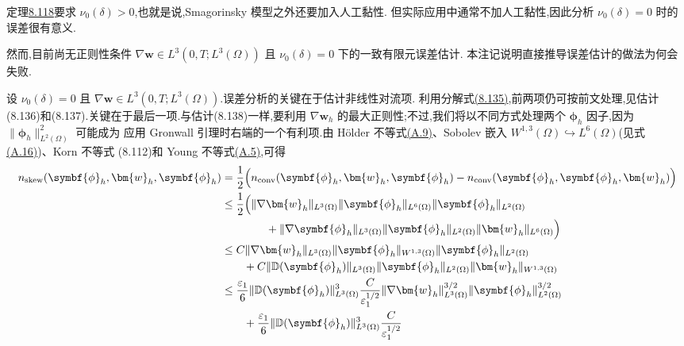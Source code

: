 \begin{note}[自然正则性下且 $\nu_0(\delta)=0$ 的情形]
\label{note:smagorinsky-error-regularity-case}
定理\hyperref[thm:smagorinsky-fem-error-estimate-standard]{8.118}要求
$\nu_0(\delta)>0$,也就是说,Smagorinsky 模型之外还要加入人工黏性.
但实际应用中通常不加人工黏性,因此分析 $\nu_0(\delta)=0$ 时的误差很有意义.

然而,目前尚无正则性条件
$\nabla\bm{w}\in L^3(0,T;L^3(\Omega))$ 且 $\nu_0(\delta)=0$ 下的一致有限元误差估计.
本注记说明直接推导误差估计的做法为何会失败.

设 $\nu_0(\delta)=0$ 且
$\nabla\bm{w}\in L^3(0,T;L^3(\Omega))$.误差分析的关键在于估计非线性对流项.
利用分解式\hyperref[eq:smagorinsky-error-convection-decomposition]{(8.135)},前两项仍可按前文处理,见估计
(8.136)和(8.137).关键在于最后一项.与估计(8.138)一样,要利用
$\nabla\bm{w}_h$ 的最大正则性;不过,我们将以不同方式处理两个
$\symbf{\phi}_h$ 因子,因为 $\|\symbf{\phi}_h\|_{L^2(\Omega)}^2$ 可能成为
应用 Gronwall 引理时右端的一个有利项.由 Hölder 不等式\hyperref[eq:appendix-a-9]{(A.9)}、Sobolev 嵌入
$W^{1,3}(\Omega)\hookrightarrow L^6(\Omega)$(见式\hyperref[eq:appendix-a-16]{(A.16)})、Korn 不等式
(8.112)和 Young 不等式\hyperref[eq:appendix-a-5]{(A.5)},可得
\begin{equation}\label{eq:smagorinsky-error-convective-zero-viscosity}
\begin{aligned}
n_{\mathrm{skew}}(\symbf{\phi}_h,\bm{w}_h,\symbf{\phi}_h)
&=\frac12\Bigl(
 n_{\mathrm{conv}}(\symbf{\phi}_h,\bm{w}_h,\symbf{\phi}_h)
 -n_{\mathrm{conv}}(\symbf{\phi}_h,\symbf{\phi}_h,\bm{w}_h)\Bigr)\\
&\le\frac12\Bigl(
 \|\nabla\bm{w}_h\|_{L^3(\Omega)}
 \|\symbf{\phi}_h\|_{L^6(\Omega)}
 \|\symbf{\phi}_h\|_{L^2(\Omega)}\\
&\qquad\qquad+
 \|\nabla\symbf{\phi}_h\|_{L^3(\Omega)}
 \|\symbf{\phi}_h\|_{L^2(\Omega)}
 \|\bm{w}_h\|_{L^6(\Omega)}\Bigr)\\
&\le C\|\nabla\bm{w}_h\|_{L^3(\Omega)}
 \|\symbf{\phi}_h\|_{W^{1,3}(\Omega)}
 \|\symbf{\phi}_h\|_{L^2(\Omega)}\\
&\qquad+C\|\mathbb{D}(\symbf{\phi}_h)\|_{L^3(\Omega)}
 \|\symbf{\phi}_h\|_{L^2(\Omega)}
 \|\bm{w}_h\|_{W^{1,3}(\Omega)}\\
&\le\frac{\varepsilon_1}{6}
 \|\mathbb{D}(\symbf{\phi}_h)\|_{L^3(\Omega)}^3
 \frac{C}{\varepsilon_1^{1/2}}
 \|\nabla\bm{w}_h\|_{L^3(\Omega)}^{3/2}
 \|\symbf{\phi}_h\|_{L^2(\Omega)}^{3/2}\\
&\qquad+\frac{\varepsilon_1}{6}
 \|\mathbb{D}(\symbf{\phi}_h)\|_{L^3(\Omega)}^3
 \frac{C}{\varepsilon_1^{1/2}}

\end{aligned}
\end{equation}
\end{note}
